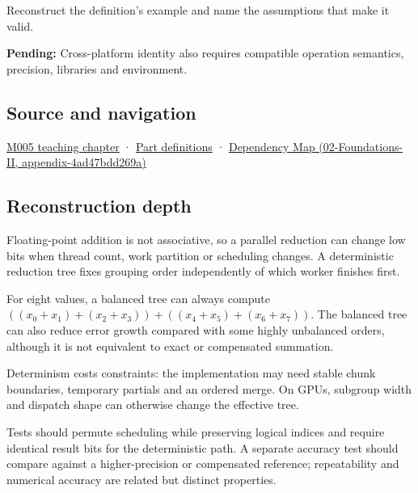 Reconstruct the definition's example and name the assumptions that make it valid.

\textbf{Pending:} Cross-platform identity also requires compatible operation semantics, precision, libraries and environment.

\subsection{Source and navigation}\label{appendix-4c8e0238e7ee-source-and-navigation}

\hyperref[01-foundations-i-ch001-when-arithmetic-meets-uncertainty]{M005 teaching chapter} · \hyperref[appendix-fd090d982a15-m005---parts-77-88]{Part definitions} · \href{../02-Foundations-II/main.pdf\#nameddest=appendix-4ad47bdd269a}{Dependency Map (02-Foundations-II, appendix-4ad47bdd269a)}

\subsection{Reconstruction depth}\label{appendix-4c8e0238e7ee-reconstruction-depth}

Floating-point addition is not associative, so a parallel reduction can change low bits when thread count, work partition or scheduling changes. A deterministic reduction tree fixes grouping order independently of which worker finishes first.

For eight values, a balanced tree can always compute \(((x_0+x_1)+(x_2+x_3)) + ((x_4+x_5)+(x_6+x_7))\). The balanced tree can also reduce error growth compared with some highly unbalanced orders, although it is not equivalent to exact or compensated summation.

Determinism costs constraints: the implementation may need stable chunk boundaries, temporary partials and an ordered merge. On GPUs, subgroup width and dispatch shape can otherwise change the effective tree.

Tests should permute scheduling while preserving logical indices and require identical result bits for the deterministic path. A separate accuracy test should compare against a higher-precision or compensated reference; repeatability and numerical accuracy are related but distinct properties.
